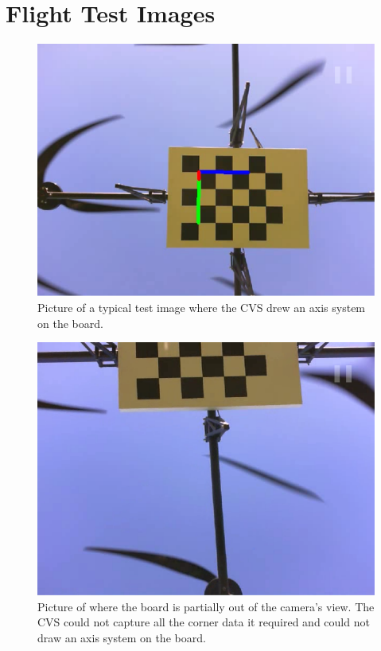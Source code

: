 \chapter{Flight Test Images}

\begin{figure}
  \centering
  \includegraphics[width=\textwidth]{figures/appendices/oov2}
  \caption{Picture of a typical test image where the CVS drew an axis system on the board.}
\end{figure}

\begin{figure}
  \centering
  \includegraphics[width=\textwidth]{figures/appendices/oov1}
  \caption{Picture of where the board is partially out of the camera's view. The CVS could not capture all the corner data it required and could not draw an axis system on the board.}
\end{figure}

